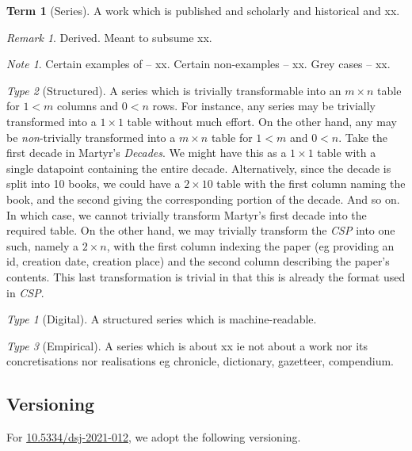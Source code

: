 \documentclass{amsart}%
\newcommand{\titleit}[1]{\textit{#1}}%
\theoremstyle{plain}
\theoremstyle{definition}
\theoremstyle{remark}
\newtheorem*{note}{Note}
\theoremstyle{definition}
\newtheorem{term}{Term}[subsection]%
\theoremstyle{remark}
\newtheorem*{term-type}{Type}
\newtheorem*{term-note}{Remark}
\begin{document}
%
%
%
%
\begin{term}[Series]
\label{term:series}
A work which is published and scholarly and historical and xx.%
\begin{term-note}
Derived. Meant to subsume xx.
\end{term-note}
\begin{note}
Certain examples of -- xx. Certain non-examples -- xx. Grey cases -- xx.
\end{note}
\begin{term-type}[Structured]
A series which is trivially transformable into an \(m\times n\) table for \(1<m\) columns and \(0<n\) rows. For instance, any series may be trivially transformed into a \(1\times 1\) table without much effort. On the other hand, any may be \emph{non}-trivially transformed into a \(m\times n\) table for \(1<m\) and \(0<n\). Take the first decade in Martyr's \titleit{Decades}. We might have this as a \(1\times 1\) table with a single datapoint containing the entire decade. Alternatively, since the decade is split into 10 books, we could have a \(2\times 10\) table with the first column naming the book, and the second giving the corresponding portion of the decade. And so on. In which case, we cannot trivially transform Martyr's first decade into the required table. On the other hand, we may trivially transform the \titleit{CSP} into one such, namely a \(2\times n\), with the first column indexing the paper (eg providing an id, creation date, creation place) and the second column describing the paper's contents. This last transformation is trivial in that this is already the format used in \titleit{CSP}.
\begin{term-type}[Digital]
A structured series which is machine-readable.%
\end{term-type}%
\end{term-type}%
\begin{term-type}[Empirical]
A series which is about xx ie not about a work nor its concretisations nor realisations eg chronicle, dictionary, gazetteer, compendium.
\end{term-type}
\end{term}
%
%
%
%
%
\subsection{Versioning}
\label{ss:versioning}
For \href{https://doi.org/10.5334/dsj-2021-012}{10.5334/dsj-2021-012}, we adopt the following versioning.
%
%
%
%
%
\end{document}
